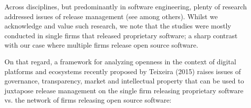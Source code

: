 \documentclass[dvipsnames]{bmcart}
\theoremstyle{definition}
\begin{document}
Across disciplines, but predominantly in software engineering, plenty of research addressed issues of release management (see \cite{Muller_et_al2006,stark1999examination,Ruhe2010book,jorgensen2001putting,Wright_et_al2012,cleveland2014orchestrating,Laukkanen2018} among others).  Whilst we acknowledge and value such research, we note that the studies were mostly conducted in single firms that released proprietary software; a sharp contrast with our case where multiple firms release open source software.  

On that regard, a framework for analyzing openness in the context of digital platforms and ecosystems recently proposed by Teixeira (2015) \cite{teixeiraopenness_2015} raises issues of governance, transparency, market and intellectual property that can be used to juxtapose release management on the single firm releasing proprietary software vs. the network of firms releasing open source software:  
\end{document}
